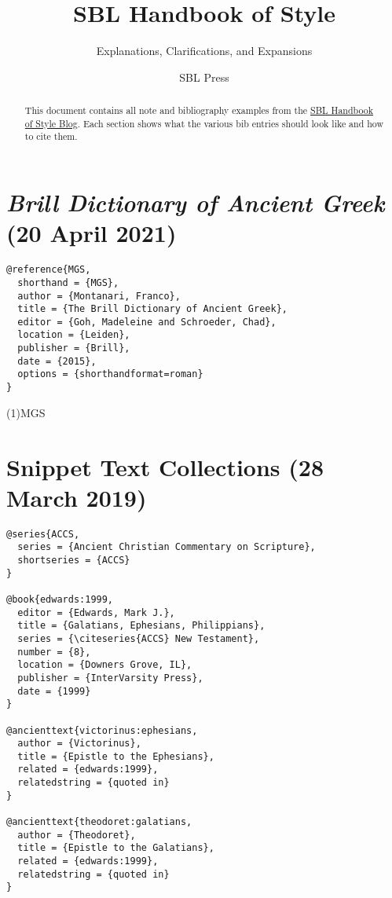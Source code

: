 \documentclass[a4paper]{article}
\begin{document}
\title{SBL Handbook of Style}
\author{Explanations, Clarifications, and Expansions}
\date{SBL Press}
\maketitle

\begin{abstract}
  This document contains all note and bibliography examples from the
  \href{https://sblhs2.com/}{SBL Handbook of Style Blog}. Each section shows
  what the various bib entries should look like and how to cite them.
\end{abstract}

\tableofcontents

\section{\emph{Brill Dictionary of Ancient Greek} (20 April 2021)}

\begin{verbatim}
@reference{MGS,
  shorthand = {MGS},
  author = {Montanari, Franco},
  title = {The Brill Dictionary of Ancient Greek},
  editor = {Goh, Madeleine and Schroeder, Chad},
  location = {Leiden},
  publisher = {Brill},
  date = {2015},
  options = {shorthandformat=roman}
}
\end{verbatim}

\examplecite(1){MGS}
\exampleabbreviations
{}

\section{Snippet Text Collections (28 March 2019)}

\begin{verbatim}
@series{ACCS,
  series = {Ancient Christian Commentary on Scripture},
  shortseries = {ACCS}
}

@book{edwards:1999,
  editor = {Edwards, Mark J.},
  title = {Galatians, Ephesians, Philippians},
  series = {\citeseries{ACCS} New Testament},
  number = {8},
  location = {Downers Grove, IL},
  publisher = {InterVarsity Press},
  date = {1999}
}

@ancienttext{victorinus:ephesians,
  author = {Victorinus},
  title = {Epistle to the Ephesians},
  related = {edwards:1999},
  relatedstring = {quoted in}
}

@ancienttext{theodoret:galatians,
  author = {Theodoret},
  title = {Epistle to the Galatians},
  related = {edwards:1999},
  relatedstring = {quoted in}
}
\end{verbatim}
\end{document}
